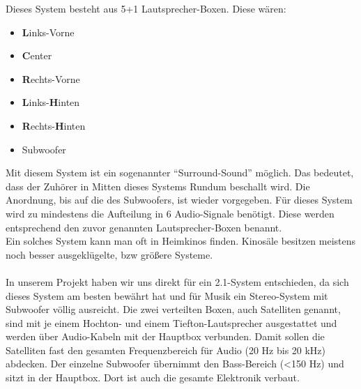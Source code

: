 Dieses System besteht aus 5+1 Lautsprecher-Boxen.
Diese wären:
\begin{itemize}
	\item \textbf{L}inks-Vorne
	\item \textbf{C}enter
	\item \textbf{R}echts-Vorne
	\item \textbf{L}inks-\textbf{H}inten
	\item \textbf{R}echts-\textbf{H}inten
	\item Subwoofer
\end{itemize}
Mit diesem System ist ein sogenannter \enquote{Surround-Sound} möglich.
Das bedeutet, dass der Zuhörer in Mitten dieses Systems Rundum beschallt wird.
Die Anordnung, bis auf die des Subwoofers, ist wieder vorgegeben.
Für dieses System wird zu mindestens die Aufteilung in 6 Audio-Signale benötigt.
Diese werden entsprechend den zuvor genannten Lautsprecher-Boxen benannt.\\
Ein solches System kann man oft in Heimkinos finden.
Kinosäle besitzen meistens noch besser ausgeklügelte, bzw größere Systeme.
\\ \\


In unserem Projekt haben wir uns direkt für ein 2.1-System entschieden, da sich dieses System am besten bewährt hat und für Musik ein Stereo-System mit Subwoofer völlig ausreicht.
Die zwei verteilten Boxen, auch Satelliten genannt, sind mit je einem Hochton- und einem Tiefton-Lautsprecher ausgestattet und werden über Audio-Kabeln mit der Hauptbox verbunden.
Damit sollen die Satelliten fast den gesamten Frequenzbereich für Audio (20 Hz bis 20 kHz) abdecken.
Der einzelne Subwoofer übernimmt den Bass-Bereich (<150 Hz) und sitzt in der Hauptbox.
Dort ist auch die gesamte Elektronik verbaut.


\newpage
